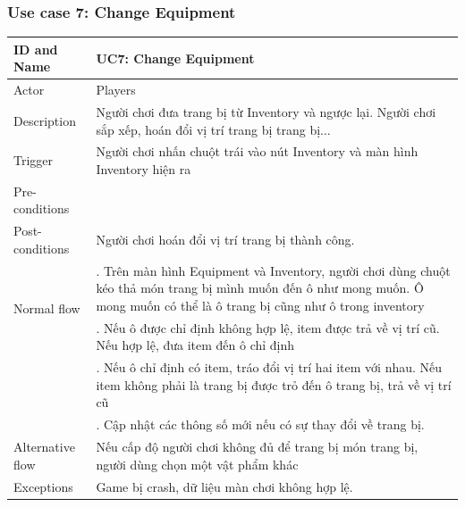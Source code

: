 \subsubsection{Use case 7: Change Equipment}
\begin{center}
	\begin{tabular}{|l|p{12cm}|}
		\hline
		ID and Name & UC7: Change Equipment \\
		\hline
		Actor  & Players \\
		\hline
		Description  & Người chơi đưa trang bị từ Inventory và ngược lại. Người chơi sắp xếp, hoán đổi vị trí trang bị trang bị...\\
		\hline
		Trigger  & Người chơi nhấn chuột trái vào nút Inventory và màn hình Inventory hiện ra\\
		\hline
		Pre-conditions &\\
		\hline
		Post-conditions  & Người chơi hoán đổi vị trí trang bị thành công.\\
		\hline
		\multirow{2}{*}{Normal flow}      &\qquad 1. Trên màn hình Equipment và Inventory, người chơi dùng chuột kéo thả món trang bị mình muốn đến ô như mong muốn. Ô mong muốn có thể là ô trang bị cũng như ô trong inventory\\
		&\qquad 2. Nếu ô được chỉ định không hợp lệ, item được trả về vị trí cũ. Nếu hợp lệ, đưa item đến ô chỉ định\\
		&\qquad 3. Nếu ô chỉ định có item, tráo đổi vị trí hai item với nhau. Nếu item không phải là trang bị được trỏ đến ô trang bị, trả về vị trí cũ\\
		&\qquad 4. Cập nhật các thông số mới nếu có sự thay đổi về trang bị.\\
		\hline
		Alternative flow  & Nếu cấp độ người chơi không đủ để trang bị món trang bị, người dùng chọn một vật phẩm khác\\
		\hline
		Exceptions  & Game bị crash, dữ liệu màn chơi không hợp lệ.\\
		\hline
	\end{tabular}
\end{center}